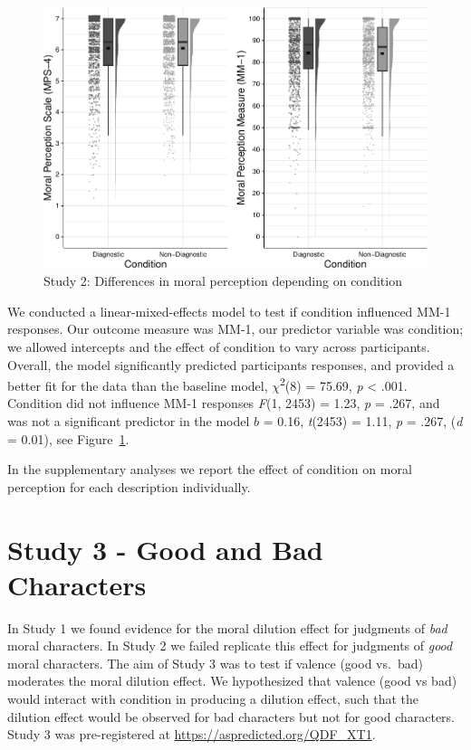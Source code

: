 \documentclass[
  man,floatsintext]{apa7}
\begin{document}
\begin{figure}
\centering
\includegraphics{moral_dilution_in_chunks_files/figure-latex/S2bothconditionplot-1.pdf}
\caption{\label{fig:S2bothconditionplot}Study 2: Differences in moral perception depending on condition}
\end{figure}

We conducted a linear-mixed-effects model to test if condition influenced MM-1 responses. Our outcome measure was MM-1, our predictor variable was condition; we allowed intercepts and the effect of condition to vary across participants. Overall, the model significantly predicted participants responses, and provided a better fit for the data than the baseline model, \(\chi\)\textsuperscript{2}(8) = 75.69, \emph{p} \textless{} .001. Condition did not influence MM-1 responses \emph{F}(1, 2453) = 1.23, \emph{p} = .267, and was not a significant predictor in the model \(b\) = 0.16, \emph{t}(2453) = 1.11, \emph{p} = .267, (\emph{d} = 0.01), see Figure~\ref{fig:S2bothconditionplot}.

In the supplementary analyses we report the effect of condition on moral perception for each description individually.

\section{Study 3 - Good and Bad Characters}\label{study-3---good-and-bad-characters}

In Study 1 we found evidence for the moral dilution effect for judgments of \emph{bad} moral characters. In Study 2 we failed replicate this effect for judgments of \emph{good} moral characters. The aim of Study 3 was to test if valence (good vs.~bad) moderates the moral dilution effect. We hypothesized that valence (good vs bad) would interact with condition in producing a dilution effect, such that the dilution effect would be observed for bad characters but not for good characters. Study 3 was pre-registered at \color{blue}\url{https://aspredicted.org/QDF_XT1}\color{black}.
\end{document}
